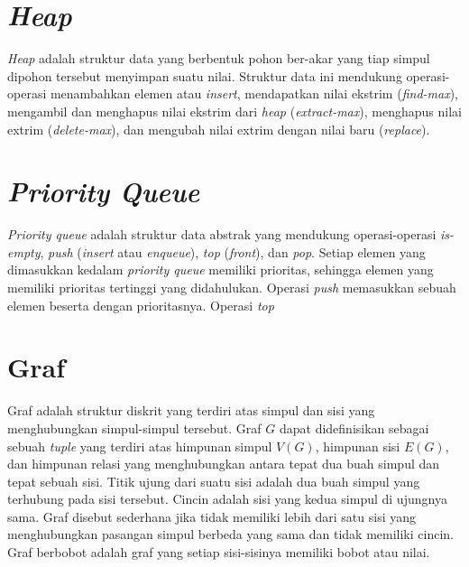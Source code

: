 \medskip

\medskip

\medskip


\section{\textit{Heap}} 

\textit{Heap} adalah struktur data yang berbentuk pohon ber-akar yang tiap simpul dipohon tersebut
menyimpan suatu nilai. Struktur data ini mendukung operasi-operasi menambahkan elemen atau
\textit{insert}, mendapatkan nilai ekstrim (\textit{find-max}), mengambil dan menghapus nilai
ekstrim dari \textit{heap} (\textit{extract-max}), menghapus nilai extrim (\textit{delete-max}), dan
mengubah nilai extrim dengan nilai baru (\textit{replace}). 

\section{\textit{Priority Queue}}

\textit{Priority queue} adalah struktur data abstrak yang mendukung operasi-operasi
\textit{is-empty}, \textit{push} (\textit{insert} atau \textit{enqueue}), \textit{top}
(\textit{front}), dan \textit{pop}. Setiap elemen yang dimasukkan kedalam \textit{priority queue}
memiliki prioritas, sehingga elemen yang memiliki prioritas tertinggi yang didahulukan. Operasi
\textit{push} memasukkan sebuah elemen beserta dengan prioritasnya. Operasi \textit{top} 

\section{Graf}

Graf adalah struktur diskrit yang terdiri atas simpul dan sisi yang menghubungkan simpul-simpul
tersebut. Graf $G$ dapat didefinisikan sebagai sebuah \textit{tuple} yang terdiri atas himpunan
simpul $V(G)$, himpunan sisi $E(G)$, dan himpunan relasi yang menghubungkan antara tepat dua buah
simpul dan tepat sebuah sisi. Titik ujung dari suatu sisi adalah dua buah simpul yang terhubung pada
sisi tersebut. Cincin adalah sisi yang kedua simpul di ujungnya sama. Graf disebut sederhana jika
tidak memiliki lebih dari satu sisi yang menghubungkan pasangan simpul berbeda yang sama dan tidak
memiliki cincin. Graf berbobot adalah graf yang setiap sisi-sisinya memiliki bobot atau nilai.

